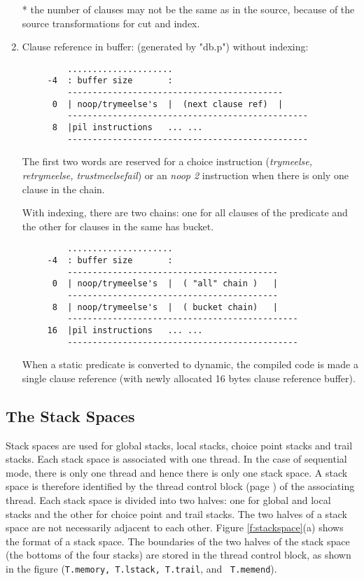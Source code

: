 \documentclass[11pt]{article}
\begin{document}
\begin{enumerate}
   * the number of clauses may not be the same as in the source,
     because of the source transformations for cut and index.

    \item Clause reference in buffer: (generated by "db.p")
\label{pg:clauseref}
        without indexing:

\begin{verbatim}
         .....................
     -4  : buffer size       :
         -------------------------------------------
      0  | noop/trymeelse's  |  (next clause ref)  |
         ------------------------------------------------
      8  |pil instructions   ... ...
         ------------------------------------------------
\end{verbatim}

	The first two words are reserved for a choice instruction
	({\it trymeelse, retrymeelse, trustmeelsefail}) or an {\it noop 2}
	instruction when there is only one clause in the chain.

        With indexing, there are two chains: one for all clauses
	of the predicate and the other for clauses in the same has bucket.

\begin{verbatim}
         .....................
     -4  : buffer size       :
         ------------------------------------------
      0  | noop/trymeelse's  |  ( "all" chain )   |
         ------------------------------------------
      8  | noop/trymeelse's  |  ( bucket chain)   |
         ----------------------------------------------
     16  |pil instructions   ... ...
         ----------------------------------------------
\end{verbatim}

	When a static predicate is converted to dynamic, the compiled
	code is made a single clause reference (with newly allocated
	16 bytes clause reference buffer).
\end{enumerate}


\subsection{The Stack Spaces}

Stack spaces are used for global stacks, local stacks, choice point
stacks and trail stacks.  Each stack space is associated with one
thread. In the case of sequential mode, there is only one thread and
hence there is only one stack space.  A stack space is therefore
identified by the thread control block (page \pageref{pg:tcb}) of the
associating thread.  Each stack space is divided into two halves: one
for global and local stacks and the other for choice point and trail
stacks.  The two halves of a stack space are not necessarily adjacent
to each other.  Figure \ref{f:stackspace}(a) shows the format of a
stack space.  The boundaries of the two halves of the stack space (the
bottoms of the four stacks) are stored in the thread control block, as
shown in the figure ({\tt T.memory, T.lstack, T.trail}, and {\tt
T.memend}).
\end{document}
